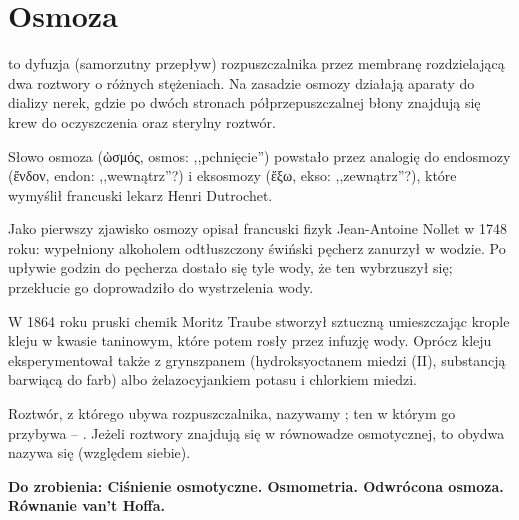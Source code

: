 
\section{Osmoza}


 to dyfuzja (samorzutny przepływ) rozpuszczalnika przez membranę rozdzielającą dwa roztwory o różnych stężeniach.
Na zasadzie osmozy działają aparaty do dializy nerek, gdzie po dwóch stronach półprzepuszczalnej błony znajdują się krew do oczyszczenia oraz sterylny roztwór.

\begin{etymology_box}
Słowo osmoza (\textgreek{ὠσμός}, osmos: ,,pchnięcie'') powstało przez analogię do endosmozy (\textgreek{ἔνδον}, endon: ,,wewnątrz''?) i eksosmozy (\textgreek{ἔξω}, ekso: ,,zewnątrz''?), które wymyślił francuski lekarz Henri Dutrochet.
\end{etymology_box}
%

Jako pierwszy zjawisko osmozy opisał francuski fizyk Jean-Antoine Nollet w 1748 roku: wypełniony alkoholem odtłuszczony świński pęcherz zanurzył w wodzie.
%
Po upływie godzin do pęcherza dostało się tyle wody, że ten wybrzuszył się; przekłucie go doprowadziło do wystrzelenia wody.

W 1864 roku pruski chemik Moritz Traube stworzył sztuczną   umieszczając krople kleju w kwasie taninowym, które potem rosły przez infuzję wody.
%
Oprócz kleju eksperymentował także z grynszpanem (hydroksyoctanem miedzi (II), substancją barwiącą do farb) albo żelazocyjankiem potasu i chlorkiem miedzi.
%
%
%

Roztwór, z którego ubywa rozpuszczalnika, nazywamy ; ten w którym go przybywa -- .
Jeżeli roztwory znajdują się w równowadze osmotycznej, to obydwa nazywa się  (względem siebie).

\textbf{Do zrobienia:
Ciśnienie osmotyczne.
Osmometria.
Odwrócona osmoza.
Równanie van't Hoffa.
}